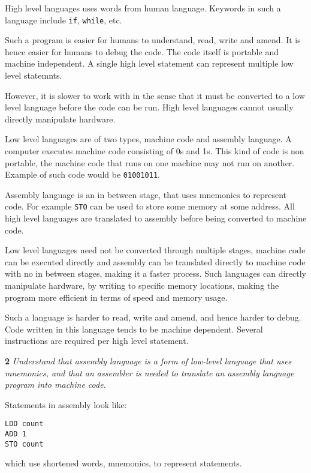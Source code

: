 High level languages uses words from human language. Keywords in such a language include 
\verb|if|, \verb|while|, etc.

Such a program is easier for humans to understand, read, write and amend. It is hence easier for
humans to debug the code. The code itself is portable and machine independent. A single high
level statement can represent multiple low level statemnts.

However, it is slower to work with in the sense that it must be converted to a low level language
before the code can be run. High level languages cannot usually directly manipulate hardware.

\medskip

Low level languages are of two types, machine code and assembly language. A computer executes
machine code consisting of 0s and 1s. This kind of code is non portable, the machine code that runs
on one machine may not run on another. Example of such code would be \verb|01001011|.

Assembly language is an in between stage, that uses mnemonics to represent code. For example
\verb|STO| can be used to store some memory at some address. All high level languages are 
translated to assembly before being converted to machine code. 

Low level languages need not be converted through multiple stages, machine code can be executed
directly and assembly can be translated directly to machine code with no in between stages, making
it a faster process. Such languages can directly manipulate hardware, by writing to specific
memory locations, making the program more efficient in terms of speed and memory usage.

Such a language is harder to read, write and amend, and hence harder to debug. Code written in this
language tends to be machine dependent. Several instructions are required per high level statement.

\bigskip

\noindent\textbf{2} \textit{Understand that assembly language is a form
of low-level language that uses mnemonics,
and that an assembler is needed to translate an
assembly language program into machine code.}

Statements in assembly look like:

\begin{center}
\begin{BVerbatim}
LDD count
ADD 1
STO count
\end{BVerbatim}
\end{center}
which use shortened words, mnemonics, to represent statements.

